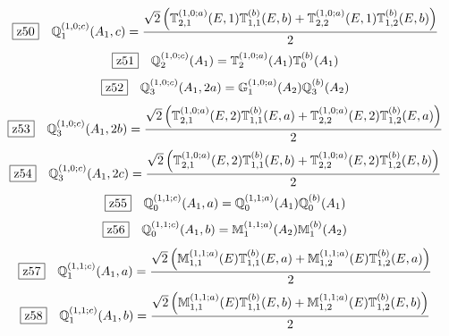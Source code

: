 \documentclass[fleqn,10pt,landscape]{jsarticle}
\begin{document}
\begin{dmath*}
\hspace*{3mm}\fbox{z50}\quad \mathbb{Q}_{1}^{(1,0;c)}(A_{1},c)=\frac{\sqrt{2} \left(\mathbb{T}_{2,1}^{(1,0;a)}(E,1) \mathbb{T}_{1,1}^{(b)}(E,b) + \mathbb{T}_{2,2}^{(1,0;a)}(E,1) \mathbb{T}_{1,2}^{(b)}(E,b)\right)}{2}
\end{dmath*}
\begin{dmath*}
\hspace*{3mm}\fbox{z51}\quad \mathbb{Q}_{2}^{(1,0;c)}(A_{1})=\mathbb{T}_{2}^{(1,0;a)}(A_{1}) \mathbb{T}_{0}^{(b)}(A_{1})
\end{dmath*}
\begin{dmath*}
\hspace*{3mm}\fbox{z52}\quad \mathbb{Q}_{3}^{(1,0;c)}(A_{1},2a)=\mathbb{G}_{1}^{(1,0;a)}(A_{2}) \mathbb{Q}_{3}^{(b)}(A_{2})
\end{dmath*}
\begin{dmath*}
\hspace*{3mm}\fbox{z53}\quad \mathbb{Q}_{3}^{(1,0;c)}(A_{1},2b)=\frac{\sqrt{2} \left(\mathbb{T}_{2,1}^{(1,0;a)}(E,2) \mathbb{T}_{1,1}^{(b)}(E,a) + \mathbb{T}_{2,2}^{(1,0;a)}(E,2) \mathbb{T}_{1,2}^{(b)}(E,a)\right)}{2}
\end{dmath*}
\begin{dmath*}
\hspace*{3mm}\fbox{z54}\quad \mathbb{Q}_{3}^{(1,0;c)}(A_{1},2c)=\frac{\sqrt{2} \left(\mathbb{T}_{2,1}^{(1,0;a)}(E,2) \mathbb{T}_{1,1}^{(b)}(E,b) + \mathbb{T}_{2,2}^{(1,0;a)}(E,2) \mathbb{T}_{1,2}^{(b)}(E,b)\right)}{2}
\end{dmath*}
\begin{dmath*}
\hspace*{3mm}\fbox{z55}\quad \mathbb{Q}_{0}^{(1,1;c)}(A_{1},a)=\mathbb{Q}_{0}^{(1,1;a)}(A_{1}) \mathbb{Q}_{0}^{(b)}(A_{1})
\end{dmath*}
\begin{dmath*}
\hspace*{3mm}\fbox{z56}\quad \mathbb{Q}_{0}^{(1,1;c)}(A_{1},b)=\mathbb{M}_{1}^{(1,1;a)}(A_{2}) \mathbb{M}_{1}^{(b)}(A_{2})
\end{dmath*}
\begin{dmath*}
\hspace*{3mm}\fbox{z57}\quad \mathbb{Q}_{1}^{(1,1;c)}(A_{1},a)=\frac{\sqrt{2} \left(\mathbb{M}_{1,1}^{(1,1;a)}(E) \mathbb{T}_{1,1}^{(b)}(E,a) + \mathbb{M}_{1,2}^{(1,1;a)}(E) \mathbb{T}_{1,2}^{(b)}(E,a)\right)}{2}
\end{dmath*}
\begin{dmath*}
\hspace*{3mm}\fbox{z58}\quad \mathbb{Q}_{1}^{(1,1;c)}(A_{1},b)=\frac{\sqrt{2} \left(\mathbb{M}_{1,1}^{(1,1;a)}(E) \mathbb{T}_{1,1}^{(b)}(E,b) + \mathbb{M}_{1,2}^{(1,1;a)}(E) \mathbb{T}_{1,2}^{(b)}(E,b)\right)}{2}
\end{dmath*}
\end{document}
